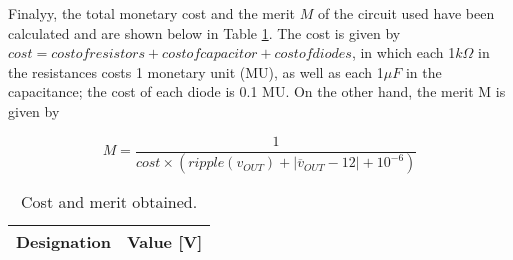 Finalyy, the total monetary cost and the merit $M$ of the circuit used have been calculated and are shown below in Table \ref{tab:rip}. The cost is given by $cost=cost of resistors + cost of capacitor + cost of diodes$, in which each 1$k\Omega$ in the resistances costs 1 monetary unit (MU), as well as each 1$\mu F$ in the capacitance; the cost of each diode is 0.1 MU. On the other hand, the  merit M is given by

\begin{equation} \label{eq:merit}
  M=\frac{1}{cost\times (ripple(v_{OUT})+|\overline{v}_{OUT}-12|+10^{-6})} 
\end{equation}


\begin{table}[H]
  \centering
  \begin{tabular}{|c|c|}
    \hline
        {\bf Designation} & {\bf Value [V]} \\ \hline
        
  \end{tabular}
  \caption{Cost and merit obtained.} 
  \label{tab:rip}
\end{table}

